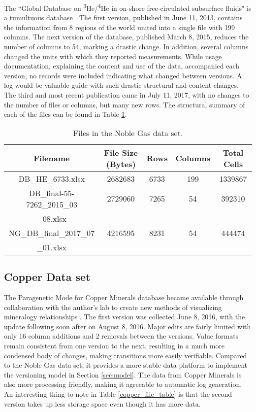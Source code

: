 The ``Global Database on \textsuperscript{3}He/\textsuperscript{4}He in on-shore free-circulated subsurface fluids" is a tumultuous database \cite{Polyak2015}.
The first \gls{version}, published in June 11, 2013, contains the information from 8 regions of the world united into a single file with 199 columns.
The next \gls{version} of the database, published March 8, 2015, reduces the number of columns to 54, marking a drastic change.
In addition, several columns changed the units with which they reported measurements.
While usage documentation, explaining the content and use of the data, accompanied each \gls{version}, no records were included indicating what changed between \glspl{version}.
A \gls{log} would be valuable guide with such drastic structural and content changes.
The third and most recent publication came in July 11, 2017, with no changes to the number of files or columns, but many new rows.
The structural summary of each of the files can be found in Table \ref{noble_gas_file_table}.

\begin{table}
	\caption{Files in the Noble Gas data set.}
	\label{noble_gas_file_table}
	\centering
	\begin{tabular}{|c|c|c|c|c|}
		\hline
		Filename & File Size (Bytes) & Rows & Columns &	Total Cells \\ \hline
		DB\_HE\_6733.xlsx &	2682683 &	6733 &	199 &	1339867 \\
		DB\_final-55-7262\_2015\_03 &	2729060 &	7265 &	54 &	392310 \\
		\_08.xlsx&&&&\\
		NG\_DB\_final\_2017\_07 &	4216595 &	8231 &	54 &	444474 \\
		\_01.xlsx&&&&\\
		\hline
	\end{tabular}
\end{table}

\subsection{Copper Data set}

The Paragenetic Mode for Copper Minerals database became available through collaboration with the author's lab to create new methods of visualizing mineralogy relationships \cite{Morrison2016}.
The first version was collected June 8, 2016, with the update following soon after on August 8, 2016.
Major edits are fairly limited with only 16 column additions and 2 removals between the versions.
Value formats remain consistent from one version to the next, resulting in a much more condensed body of changes, making transitions more easily verifiable.
Compared to the Noble Gas data set, it provides a more stable data platform to implement the versioning model in Section \ref{sec:model}.
The data from Copper Minerals is also more processing friendly, making it agreeable to automatic \gls{log} generation.
An interesting thing to note in Table \ref{copper_file_table} is that the second version takes up less storage space even though it has more data.


